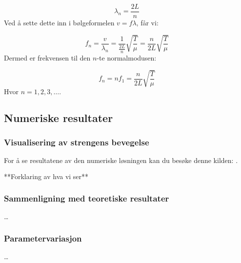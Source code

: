 \begin{equation*}
    \lambda_n = \frac{2L}{n}
\end{equation*}
Ved å sette dette inn i bølgeformelen $v = f \lambda$, får vi:

\begin{equation*}
    f_n = \frac{v}{\lambda_n} = \frac{1}{\frac{2L}{n}} \sqrt{\frac{T}{\mu}} = \frac{n}{2L} \sqrt{\frac{T}{\mu}}
\end{equation*}
Dermed er frekvensen til den $n$-te normalmodusen:

\begin{equation*}
    f_n = n f_1 = \frac{n}{2L} \sqrt{\frac{T}{\mu}}
\end{equation*}
Hvor $n = 1, 2, 3, \ldots$.




\subsection{Numeriske resultater}
\subsubsection{Visualisering av strengens bevegelse}
For å se resultatene av den numeriske løsningen kan du besøke denne kilden: \parencite{simuleringVideo}.

{\color{red}**Forklaring av hva vi ser**}


\subsubsection{Sammenligning med teoretiske resultater}
\dots

\subsubsection{Parametervariasjon}
\dots